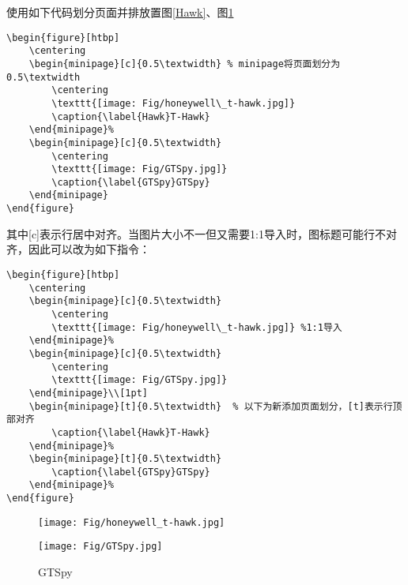 使用如下代码划分页面并排放置图\ref{Hawk}、图\ref{GTSpy}
\begin{lstlisting}
\begin{figure}[htbp]
	\centering
	\begin{minipage}[c]{0.5\textwidth} % minipage将页面划分为0.5\textwidth
		\centering
		\texttt{[image: Fig/honeywell\_t-hawk.jpg]}
		\caption{\label{Hawk}T-Hawk}
	\end{minipage}%
	\begin{minipage}[c]{0.5\textwidth}
		\centering
		\texttt{[image: Fig/GTSpy.jpg]}
		\caption{\label{GTSpy}GTSpy}
	\end{minipage}
\end{figure}
\end{lstlisting}
其中[c]表示行居中对齐。当图片大小不一但又需要1:1导入时，图标题可能行不对齐，因此可以改为如下指令：
\begin{lstlisting}
\begin{figure}[htbp]
	\centering
	\begin{minipage}[c]{0.5\textwidth}
		\centering
		\texttt{[image: Fig/honeywell\_t-hawk.jpg]} %1:1导入
	\end{minipage}%
	\begin{minipage}[c]{0.5\textwidth}
		\centering
		\texttt{[image: Fig/GTSpy.jpg]}
	\end{minipage}\\[1pt]
	\begin{minipage}[t]{0.5\textwidth}	% 以下为新添加页面划分，[t]表示行顶部对齐
		\caption{\label{Hawk}T-Hawk}
	\end{minipage}%
	\begin{minipage}[t]{0.5\textwidth}
		\caption{\label{GTSpy}GTSpy}
	\end{minipage}%
\end{figure}
\end{lstlisting}
\begin{figure}[htbp]
	\centering
	\begin{minipage}[c]{0.5\textwidth}
		\centering
		\texttt{[image: Fig/honeywell\_t-hawk.jpg]}
		\caption{\label{Hawk}T-Hawk}
	\end{minipage}%
	\begin{minipage}[c]{0.5\textwidth}
		\centering
		\texttt{[image: Fig/GTSpy.jpg]}
		\caption{\label{GTSpy}GTSpy}
	\end{minipage}
\end{figure}


